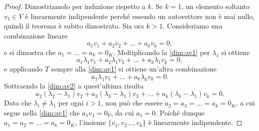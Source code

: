 \begin{proof}
	Dimostriamolo per induzione rispetto a $k$.
	Se $k=1$, un elemento soltanto $v_1\in V$ è linearmente indipendente perché essendo un autovettore non è mai nullo, quindi il teorema è subito dimostrato.
	Sia ora $k>1$.
	Consideriamo una combinazione lineare
	\begin{equation}\label{dim:av1}
		a_1v_1+a_2v_2+\dots+a_kv_k=0,\tag{a}
	\end{equation}
	e si dimostra che $a_1=\dots=a_k=0_K$. Moltiplicando la \eqref{dim:av1} per $\lambda_1$ si ottiene
	\begin{equation}\label{dim:av2}
		a_1\lambda_1v_1+a_2\lambda_1v_2+\dots+a_k\lambda_1v_k=0,\tag{b}
	\end{equation}
	e applicando $T$ sempre alla \eqref{dim:av1} si ottiene un'altra combinazione
	\begin{equation}\label{dim:av3}
		a_1\lambda_1v_1+\dots+a_k\lambda_kv_k=0.\tag{c}
	\end{equation}
	Sottraendo la \eqref{dim:av2} a quest'ultima risulta
	\begin{equation*}
		a_2(\lambda_2-\lambda_1)v_2+a_3(\lambda_3-\lambda_1)v_3+\dots+a_k(\lambda_k-\lambda_1)v_k=0.
	\end{equation*}
	Dato che $\lambda_i\neq\lambda_1$ per ogni $i>1$, non può che essere $a_2=a_3=\dots=a_k=0_K$, a cui segue nella \eqref{dim:av1} che $a_1v_1=0_V$, da cui $a_1=0$.
	Poiché dunque $a_1=a_2=\dots=a_k=0_K$, l'insieme $\{v_1,v_2\dots,v_k\}$ è linearmente indipendente.
\end{proof}

